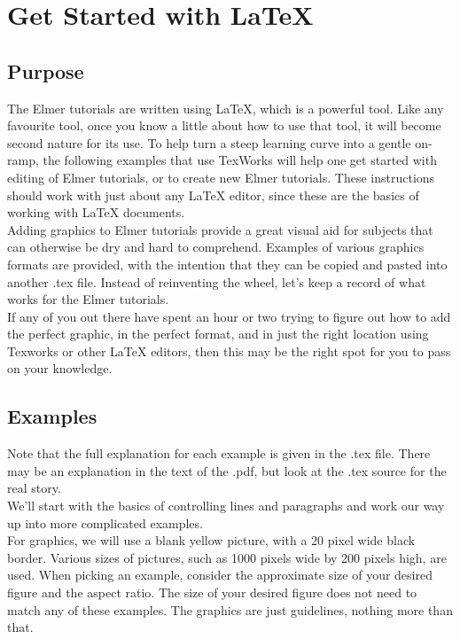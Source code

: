 \chapter{Get Started with LaTeX}



\section{Purpose}

The Elmer tutorials are written using LaTeX, which is a powerful tool.  Like any favourite tool, once you know a little about how to use that tool, it will become second nature for its use.  To help turn a steep learning curve into a gentle on-ramp, the following examples that use TexWorks will help one get started with editing of Elmer tutorials, or to create new Elmer tutorials.  These instructions should work with just about any LaTeX editor, since these are the basics of working with LaTeX documents.\\

Adding graphics to Elmer tutorials provide a great visual aid for subjects that can otherwise be dry and hard to comprehend. Examples of various graphics formats are provided, with the intention that they can be copied and pasted into another .tex file.  Instead of reinventing the wheel, let's keep a record of what works for the Elmer tutorials.\\

If any of you out there have spent an hour or two trying to figure out how to add the perfect graphic, in the perfect format, and in just the right location using Texworks or other LaTeX editors, then this may be the right spot for you to pass on your knowledge.


\section{Examples}

Note that the full explanation for each example is given in the .tex file. There may be an explanation in the text of the .pdf, but look at the .tex source for the real story.\\

We'll  start with the basics of controlling lines and paragraphs and work our way up into more complicated examples.\\


For graphics, we will use a blank yellow picture, with a 20 pixel wide black border.  Various sizes of pictures, such as 1000 pixels wide by 200 pixels high, are used.  When picking an example, consider the approximate size of your desired figure and the aspect ratio.  The size of your desired figure does not need to match any of these examples. The graphics are just guidelines, nothing more than that.\\

